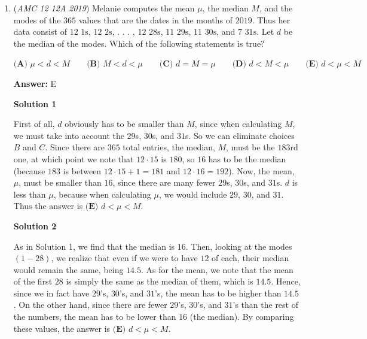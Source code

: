 \begin{enumerate}
 Statement $2$ is also true. A translation to the left or right will place the image onto itself when the figures above and below the line realign (the figure goes on infinitely in both directions). 

 Statement $3$ is false. A reflection across line $\ell$ will change the up-facing squares to down-facing squares and vice versa. 

 Finally, statement $4$ is also false because it will cause the diagonal lines extending from the squares to switch direction. 

 Thus, $\fbox {\textbf{(C)}  2}$ statements are true.

 Education, the Study of Everything

 


	\item (\textit{AMC 12 12A 2019}) Melanie computes the mean $\mu$, the median $M$, and the modes of the $365$ values that are the dates in the months of $2019$. Thus her data consist of $12$ $1\text{s}$, $12$ $2\text{s}$, . . . , $12$ $28\text{s}$, $11$ $29\text{s}$, $11$ $30\text{s}$, and $7$ $31\text{s}$. Let $d$ be the median of the modes. Which of the following statements is true?


 $\textbf{(A) } \mu < d < M \qquad\textbf{(B) } M < d < \mu \qquad\textbf{(C) } d = M =\mu \qquad\textbf{(D) } d < M < \mu \qquad\textbf{(E) } d < \mu < M$

 \textbf{Answer: }E



\textbf{Solution 1}

First of all, $d$ obviously has to be smaller than $M$, since when calculating $M$, we must take into account the $29$s, $30$s, and $31$s. So we can eliminate choices $B$ and $C$. Since there are $365$ total entries, the median, $M$, must be the $183\text{rd}$ one, at which point we note that $12 \cdot 15$ is $180$, so $16$ has to be the median (because $183$ is between $12 \cdot 15 + 1 = 181$ and $12 \cdot 16 = 192$). Now, the mean, $\mu$, must be smaller than $16$, since there are many fewer $29$s, $30$s, and $31$s. $d$ is less than $\mu$, because when calculating $\mu$, we would include $29$, $30$, and $31$. Thus the answer is $\boxed{\textbf{(E) } d < \mu < M}$.

 



\textbf{Solution 2}

As in Solution 1, we find that the median is $16$. Then, looking at the modes $(1-28)$, we realize that even if we were to have $12$ of each, their median would remain the same, being $14.5$. As for the mean, we note that the mean of the first $28$ is simply the same as the median of them, which is $14.5$. Hence, since we in fact have $29$'s, $30$'s, and $31$'s, the mean has to be higher than $14.5$. On the other hand, since there are fewer $29$'s, $30$'s, and $31$'s than the rest of the numbers, the mean has to be lower than $16$ (the median). By comparing these values, the answer is $\boxed{\textbf{(E) } d < \mu < M}$.


\end{enumerate}
